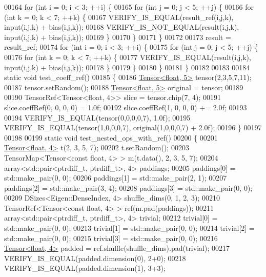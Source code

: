 \begin{DoxyCode}
00164   \textcolor{keywordflow}{for} (\textcolor{keywordtype}{int} i = 0; i < 3; ++i) \{
00165     \textcolor{keywordflow}{for} (\textcolor{keywordtype}{int} j = 0; j < 5; ++j) \{
00166       \textcolor{keywordflow}{for} (\textcolor{keywordtype}{int} k = 0; k < 7; ++k) \{
00167         VERIFY\_IS\_EQUAL(result\_ref(i,j,k), input(i,j,k) + bias(i,j,k));
00168         VERIFY\_IS\_NOT\_EQUAL(result(i,j,k), input(i,j,k) + bias(i,j,k));
00169       \}
00170     \}
00171   \}
00172 
00173   result = result\_ref;
00174   \textcolor{keywordflow}{for} (\textcolor{keywordtype}{int} i = 0; i < 3; ++i) \{
00175     \textcolor{keywordflow}{for} (\textcolor{keywordtype}{int} j = 0; j < 5; ++j) \{
00176       \textcolor{keywordflow}{for} (\textcolor{keywordtype}{int} k = 0; k < 7; ++k) \{
00177         VERIFY\_IS\_EQUAL(result(i,j,k), input(i,j,k) + bias(i,j,k));
00178       \}
00179     \}
00180   \}
00181 \}
00182 
00183 
00184 \textcolor{keyword}{static} \textcolor{keywordtype}{void} test\_coeff\_ref()
00185 \{
00186   \hyperlink{class_eigen_1_1_tensor}{Tensor<float, 5>} tensor(2,3,5,7,11);
00187   tensor.setRandom();
00188   \hyperlink{class_eigen_1_1_tensor}{Tensor<float, 5>} original = tensor;
00189 
00190   TensorRef<Tensor<float, 4>> slice = tensor.chip(7, 4);
00191   slice.coeffRef(0, 0, 0, 0) = 1.0f;
00192   slice.coeffRef(1, 0, 0, 0) += 2.0f;
00193 
00194   VERIFY\_IS\_EQUAL(tensor(0,0,0,0,7), 1.0f);
00195   VERIFY\_IS\_EQUAL(tensor(1,0,0,0,7), original(1,0,0,0,7) + 2.0f);
00196 \}
00197 
00198 
00199 \textcolor{keyword}{static} \textcolor{keywordtype}{void} test\_nested\_ops\_with\_ref()
00200 \{
00201   \hyperlink{class_eigen_1_1_tensor}{Tensor<float, 4>} t(2, 3, 5, 7);
00202   t.setRandom();
00203   TensorMap<Tensor<const float, 4> > m(t.data(), 2, 3, 5, 7);
00204   array<std::pair<ptrdiff\_t, ptrdiff\_t>, 4> paddings;
00205   paddings[0] = std::make\_pair(0, 0);
00206   paddings[1] = std::make\_pair(2, 1);
00207   paddings[2] = std::make\_pair(3, 4);
00208   paddings[3] = std::make\_pair(0, 0);
00209   DSizes<Eigen::DenseIndex, 4> shuffle\_dims(0, 1, 2, 3);
00210   TensorRef<Tensor<const float, 4> > ref(m.pad(paddings));
00211   array<std::pair<ptrdiff\_t, ptrdiff\_t>, 4> trivial;
00212   trivial[0] = std::make\_pair(0, 0);
00213   trivial[1] = std::make\_pair(0, 0);
00214   trivial[2] = std::make\_pair(0, 0);
00215   trivial[3] = std::make\_pair(0, 0);
00216   \hyperlink{class_eigen_1_1_tensor}{Tensor<float, 4>} padded = ref.shuffle(shuffle\_dims).pad(trivial);
00217   VERIFY\_IS\_EQUAL(padded.dimension(0), 2+0);
00218   VERIFY\_IS\_EQUAL(padded.dimension(1), 3+3);

\end{DoxyCode}
